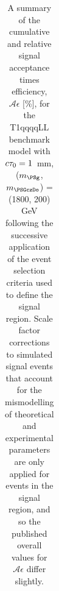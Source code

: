 \begin{table}[p]
\begin{center}
\begin{tabular}{lrr}
      \hline
        \end{tabular}
        \caption{A summary of the cumulative and relative signal acceptance times
        efficiency, $\mathcal{A}\epsilon$ [\%], for the
        T1qqqqLL benchmark model with $c\tau_{0}=1$~mm, ($m_{\PSg}$, $m_{\PSGczDo}$) = (1800, 200) GeV
        following the successive application of
        the event selection criteria used to define the signal region.  Scale
        factor corrections to simulated signal events that account for the
        mismodelling of theoretical and experimental parameters are only
        applied for events in the signal region, and so the published overall
        values for $\mathcal{A}\epsilon$ differ slightly.
}
        \label{tab:T1qqqqLL_1_1800_200_MR_sig}
    \end{center}
\end{table}
